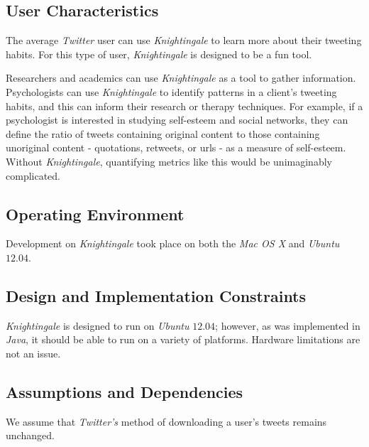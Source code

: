 \documentclass[a4paper, 12pt]{article}
\begin{document}
\subsection{User Characteristics} \label{sec:userc}
\begin{adjustwidth}{2em}{0pt}
The average \textit{Twitter} user can use \textit{Knightingale} to learn more about their tweeting habits. For this type of user, \textit{Knightingale} is designed to be a fun tool. \newline

\noindent Researchers and academics can use \textit{Knightingale} as a tool to gather information. Psychologists can use \textit{Knightingale} to identify patterns in a client's tweeting habits, and this can inform their research or therapy techniques. For example, if a psychologist is interested in studying self-esteem and social networks, they can define the ratio of tweets containing original content to those containing unoriginal content - quotations, retweets, or urls - as a measure of self-esteem. Without \textit{Knightingale}, quantifying metrics like this would be unimaginably complicated.
\end{adjustwidth}

\subsection{Operating Environment} \label{sec:operating}
\begin{adjustwidth}{2em}{0pt}
Development on \textit{Knightingale} took place on both the \textit{Mac OS X} and \textit{Ubuntu} $12.04$.
\end{adjustwidth}

\subsection{Design and Implementation Constraints} \label{sec:constraints}
\begin{adjustwidth}{2em}{0pt}
\textit{Knightingale} is designed to run on \textit{Ubuntu} $12.04$; however, as was implemented in \textit{Java}, it should be able to run on a variety of platforms. Hardware limitations are not an issue.
\end{adjustwidth}

\subsection{Assumptions and Dependencies} \label{sec:and}
\begin{adjustwidth}{2em}{0pt}
We assume that \textit{Twitter's} method of downloading a user's tweets remains unchanged. 
\end{adjustwidth}
\end{document}

